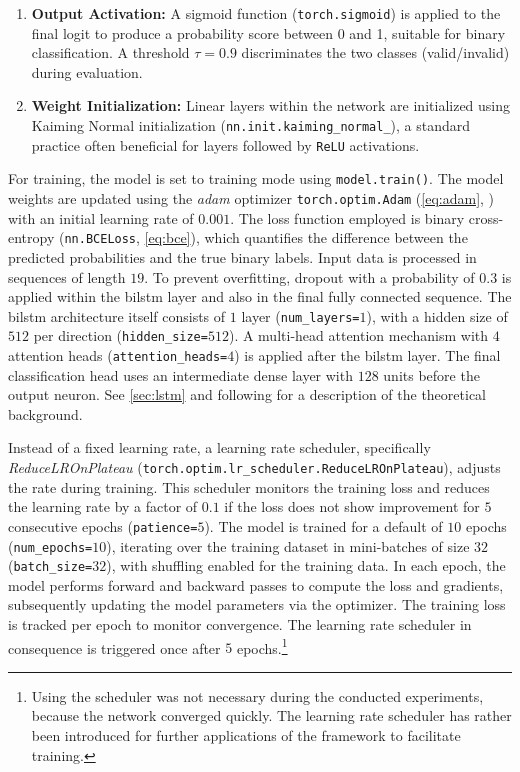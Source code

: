 \begin{enumerate}
  \item \textbf{Output Activation:} A sigmoid function (\texttt{torch.sigmoid}) is applied to the final logit to produce a probability score between 0 and 1, suitable for binary classification. A threshold $\tau = 0.9$ discriminates the two classes (valid/invalid) during evaluation.

  \item \textbf{Weight Initialization:} Linear layers within the network are initialized using Kaiming Normal initialization (\texttt{nn.init.kaiming\_normal\_}), a standard practice often beneficial for layers followed by \texttt{ReLU} activations.
\end{enumerate}

For training, the model is set to training mode using \texttt{model.train()}. The model weights are updated using the \textit{\gls{adam}} optimizer \texttt{torch.optim.Adam} (\autoref{eq:adam}, \autocite{kingma2014adam}) with an initial learning rate of $0.001$. The loss function employed is binary cross-entropy (\texttt{nn.BCELoss}, \autoref{eq:bce}), which quantifies the difference between the predicted probabilities and the true binary labels. Input data is processed in sequences of length $19$. To prevent overfitting, dropout with a probability of $0.3$ is applied within the \gls{bilstm} layer and also in the final fully connected sequence. The \gls{bilstm} architecture itself consists of $1$ layer (\texttt{num\_layers=$1$}), with a hidden size of $512$ per direction (\texttt{hidden\_size=$512$}). A multi-head attention mechanism with $4$ attention heads (\texttt{attention\_heads=$4$}) is applied after the \gls{bilstm} layer. The final classification head uses an intermediate dense layer with $128$ units before the output neuron. See \autoref{sec:lstm} and following for a description of the theoretical background.

Instead of a fixed learning rate, a learning rate scheduler, specifically \textit{ReduceLROnPlateau} (\texttt{torch.optim.lr\_scheduler.ReduceLROnPlateau}), adjusts the rate during training. This scheduler monitors the training loss and reduces the learning rate by a factor of $0.1$ if the loss does not show improvement for $5$ consecutive epochs (\texttt{patience=$5$}). The model is trained for a default of $10$ epochs (\texttt{num\_epochs=$10$}), iterating over the training dataset in mini-batches of size $32$ (\texttt{batch\_size=$32$}), with shuffling enabled for the training data. In each epoch, the model performs forward and backward passes to compute the loss and gradients, subsequently updating the model parameters via the optimizer. The training loss is tracked per epoch to monitor convergence. The learning rate scheduler in consequence is triggered once after $5$ epochs.\footnote{Using the scheduler was not necessary during the conducted experiments, because the network converged quickly. The learning rate scheduler has rather been introduced for further applications of the framework to facilitate training.}

